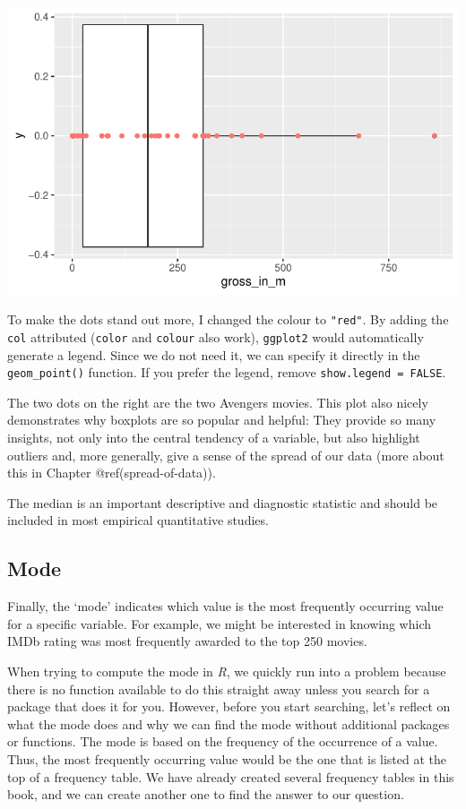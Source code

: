 \documentclass[
  letterpaper,
]{krantz}
\begin{document}
\includegraphics{08_descriptive_statistics_files/figure-pdf/boxplot-plus-geom-point-action-movies-1.pdf}

To make the dots stand out more, I changed the colour to \texttt{"red"}.
By adding the \texttt{col} attributed (\texttt{color} and
\texttt{colour} also work), \texttt{ggplot2} would automatically
generate a legend. Since we do not need it, we can specify it directly
in the \texttt{geom\_point()} function. If you prefer the legend, remove
\texttt{show.legend\ =\ FALSE}.

The two dots on the right are the two Avengers movies. This plot also
nicely demonstrates why boxplots are so popular and helpful: They
provide so many insights, not only into the central tendency of a
variable, but also highlight outliers and, more generally, give a sense
of the spread of our data (more about this in Chapter
@ref(spread-of-data)).

The median is an important descriptive and diagnostic statistic and
should be included in most empirical quantitative studies.

\subsection{Mode}\label{mode}

Finally, the `mode' indicates which value is the most frequently
occurring value for a specific variable. For example, we might be
interested in knowing which IMDb rating was most frequently awarded to
the top 250 movies.

When trying to compute the mode in \emph{R}, we quickly run into a
problem because there is no function available to do this straight away
unless you search for a package that does it for you. However, before
you start searching, let's reflect on what the mode does and why we can
find the mode without additional packages or functions. The mode is
based on the frequency of the occurrence of a value. Thus, the most
frequently occurring value would be the one that is listed at the top of
a frequency table. We have already created several frequency tables in
this book, and we can create another one to find the answer to our
question.
\end{document}
